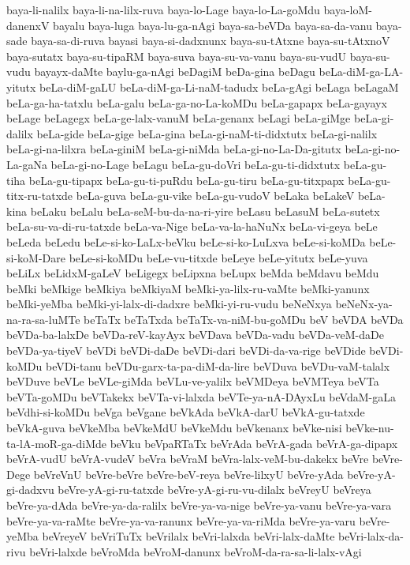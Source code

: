 {baya-li-nalilx
baya-li-na-lilx-ruva
baya-lo-Lage
baya-lo-La-goMdu
baya-loM-danenxV
bayalu
baya-luga
baya-lu-ga-nAgi
baya-sa-beVDa
baya-sa-da-vanu
baya-sade
baya-sa-di-ruva
bayasi
baya-si-dadxnunx
baya-su-tAtxne
baya-su-tAtxnoV
baya-sutatx
baya-su-tipaRM
baya-suva
baya-su-va-vanu
baya-su-vudU
baya-su-vudu
bayayx-daMte
baylu-ga-nAgi
beDagiM
beDa-gina
beDagu
beLa-diM-ga-LA-yitutx
beLa-diM-gaLU
beLa-diM-ga-Li-naM-tadudx
beLa-gAgi
beLaga
beLagaM
beLa-ga-ha-tatxlu
beLa-galu
beLa-ga-no-La-koMDu
beLa-gapapx
beLa-gayayx
beLage
beLagegx
beLa-ge-lalx-vanuM
beLa-genanx
beLagi
beLa-giMge
beLa-gi-dalilx
beLa-gide
beLa-gige
beLa-gina
beLa-gi-naM-ti-didxtutx
beLa-gi-nalilx
beLa-gi-na-lilxra
beLa-giniM
beLa-gi-niMda
beLa-gi-no-La-Da-gitutx
beLa-gi-no-La-gaNa
beLa-gi-no-Lage
beLagu
beLa-gu-doVri
beLa-gu-ti-didxtutx
beLa-gu-tiha
beLa-gu-tipapx
beLa-gu-ti-puRdu
beLa-gu-tiru
beLa-gu-titxpapx
beLa-gu-titx-ru-tatxde
beLa-guva
beLa-gu-vike
beLa-gu-vudoV
beLaka
beLakeV
beLa-kina
beLaku
beLalu
beLa-seM-bu-da-na-ri-yire
beLasu
beLasuM
beLa-sutetx
beLa-su-va-di-ru-tatxde
beLa-va-Nige
beLa-va-la-haNuNx
beLa-vi-geya
beLe
beLeda
beLedu
beLe-si-ko-LaLx-beVku
beLe-si-ko-LuLxva
beLe-si-koMDa
beLe-si-koM-Dare
beLe-si-koMDu
beLe-vu-titxde
beLeye
beLe-yitutx
beLe-yuva
beLiLx
beLidxM-gaLeV
beLigegx
beLipxna
beLupx
beMda
beMdavu
beMdu
beMki
beMkige
beMkiya
beMkiyaM
beMki-ya-lilx-ru-vaMte
beMki-yanunx
beMki-yeMba
beMki-yi-lalx-di-dadxre
beMki-yi-ru-vudu
beNeNxya
beNeNx-ya-na-ra-sa-luMTe
beTaTx
beTaTxda
beTaTx-va-niM-bu-goMDu
beV
beVDA
beVDa
beVDa-ba-lalxDe
beVDa-reV-kayAyx
beVDava
beVDa-vadu
beVDa-veM-daDe
beVDa-ya-tiyeV
beVDi
beVDi-daDe
beVDi-dari
beVDi-da-va-rige
beVDide
beVDi-koMDu
beVDi-tanu
beVDu-garx-ta-pa-diM-da-lire
beVDuva
beVDu-vaM-talalx
beVDuve
beVLe
beVLe-giMda
beVLu-ve-yalilx
beVMDeya
beVMTeya
beVTa
beVTa-goMDu
beVTakekx
beVTa-vi-lalxda
beVTe-ya-nA-DAyxLu
beVdaM-gaLa
beVdhi-si-koMDu
beVga
beVgane
beVkAda
beVkA-darU
beVkA-gu-tatxde
beVkA-guva
beVkeMba
beVkeMdU
beVkeMdu
beVkenanx
beVke-nisi
beVke-nu-ta-lA-moR-ga-diMde
beVku
beVpaRTaTx
beVrAda
beVrA-gada
beVrA-ga-dipapx
beVrA-vudU
beVrA-vudeV
beVra
beVraM
beVra-lalx-veM-bu-dakekx
beVre
beVre-Dege
beVreVnU
beVre-beVre
beVre-beV-reya
beVre-lilxyU
beVre-yAda
beVre-yA-gi-dadxvu
beVre-yA-gi-ru-tatxde
beVre-yA-gi-ru-vu-dilalx
beVreyU
beVreya
beVre-ya-dAda
beVre-ya-da-ralilx
beVre-ya-va-nige
beVre-ya-vanu
beVre-ya-vara
beVre-ya-va-raMte
beVre-ya-va-ranunx
beVre-ya-va-riMda
beVre-ya-varu
beVre-yeMba
beVreyeV
beVriTuTx
beVrilalx
beVri-lalxda
beVri-lalx-daMte
beVri-lalx-da-rivu
beVri-lalxde
beVroMda
beVroM-danunx
beVroM-da-ra-sa-li-lalx-vAgi
}
